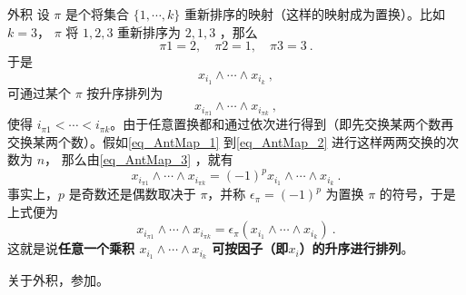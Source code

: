 \begin{example}{外积}
设 $\pi$ 是个将集合 $\{1,\cdots,k\}$ 重新排序的映射（这样的映射成为置换）。比如$k=3$， $\pi$ 将 $1,2,3$ 重新排序为 $2,1,3$ ，那么
\begin{equation}
\pi 1=2,\quad\pi2=1,\quad \pi3=3~.
\end{equation}
于是
\begin{equation}\label{eq_AntMap_1}
x_{i_1}\wedge\cdots\wedge x_{i_k}~,
\end{equation}
可通过某个 $\pi$ 按升序排列为
\begin{equation}\label{eq_AntMap_2}
x_{i_{\pi1}}\wedge\cdots\wedge x_{i_{\pi k}}~,
\end{equation}
使得 $i_{\pi1}<\cdots< i_{\pi k}$。由于任意置换都和通过依次进行得到（即先交换某两个数再交换某两个数）。假如\autoref{eq_AntMap_1} 到\autoref{eq_AntMap_2} 进行这样两两交换的次数为 $n$，
那么由\autoref{eq_AntMap_3} ，就有
\begin{equation}
x_{i_{\pi1}}\wedge\cdots\wedge x_{i_{\pi k}}=(-1)^p x_{i_1}\wedge\cdots\wedge x_{i_k}~.
\end{equation}
事实上，$p$ 是奇数还是偶数取决于 $\pi$，并称 $\epsilon_\pi=(-1)^p$ 为置换 $\pi$ 的符号，于是上式便为
\begin{equation}
x_{i_{\pi1}}\wedge\cdots\wedge x_{i_{\pi k}}=\epsilon_\pi (x_{i_1}\wedge\cdots\wedge x_{i_k})~.
\end{equation}
这就是说\textbf{任意一个乘积 $x_{i_1}\wedge\cdots\wedge x_{i_k}$ 可按因子（即$x_i$）的升序进行排列}。

关于外积，参加。
\end{example}
